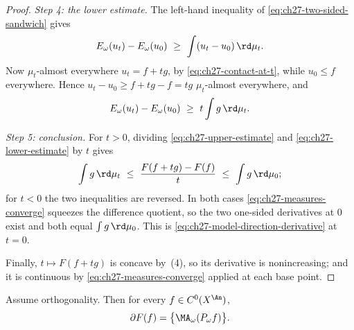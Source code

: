 \begin{proof}
\emph{Step 4: the lower estimate.}
The left-hand inequality of \eqref{eq:ch27-two-sided-sandwich} gives
\[
 E_\omega(u_t)-E_\omega(u_0)\ \geq\ \int(u_t-u_0)\,\rd\mu_t .
\]
Now \(\mu_t\)-almost everywhere \(u_t=f+tg\), by
\eqref{eq:ch27-contact-at-t}, while \(u_0\leq f\) everywhere.  Hence
\(u_t-u_0\geq f+tg-f=tg\) \(\mu_t\)-almost everywhere, and
\begin{equation}\label{eq:ch27-lower-estimate}
 E_\omega(u_t)-E_\omega(u_0)\ \geq\ t\int g\,\rd\mu_t .
\end{equation}

\emph{Step 5: conclusion.}
For \(t>0\), dividing \eqref{eq:ch27-upper-estimate} and
\eqref{eq:ch27-lower-estimate} by \(t\) gives
\[
 \int g\,\rd\mu_t
 \ \leq\ \frac{F(f+tg)-F(f)}{t}
 \ \leq\ \int g\,\rd\mu_0 ;
\]
for \(t<0\) the two inequalities are reversed.  In both cases
\eqref{eq:ch27-measures-converge} squeezes the difference quotient, so the
two one-sided derivatives at \(0\) exist and both equal
\(\int g\,\rd\mu_0\).  This is
\eqref{eq:ch27-model-direction-derivative} at \(t=0\).

Finally, \(t\mapsto F(f+tg)\) is concave by
\,(4), so its derivative is nonincreasing; and
it is continuous by \eqref{eq:ch27-measures-converge} applied at each base
point.
\end{proof}

\begin{center}
\end{center}

\begin{corollary}
\label{cor:ch27-singleton}
Assume orthogonality.  Then for every \(f\in C^0(X^{\An})\),
\[
 \partial F(f)=\bigl\{\MA_\omega(P_\omega f)\bigr\}.
\]
\end{corollary}

